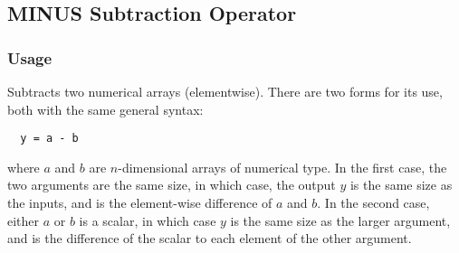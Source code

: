 %
%
%
\subsection{MINUS Subtraction Operator}
\subsubsection{Usage}
Subtracts two numerical arrays (elementwise).  There are two forms
for its use, both with the same general syntax:
\begin{verbatim}
  y = a - b
\end{verbatim}
where $a$ and $b$ are $n$-dimensional arrays of numerical type.  In the
first case, the two arguments are the same size, in which case, the 
output $y$ is the same size as the inputs, and is the element-wise
difference of $a$ and $b$.  In the second case, either $a$ or $b$ is a scalar, 
in which case $y$ is the same size as the larger argument,
and is the difference of the scalar to each element of the other argument.

